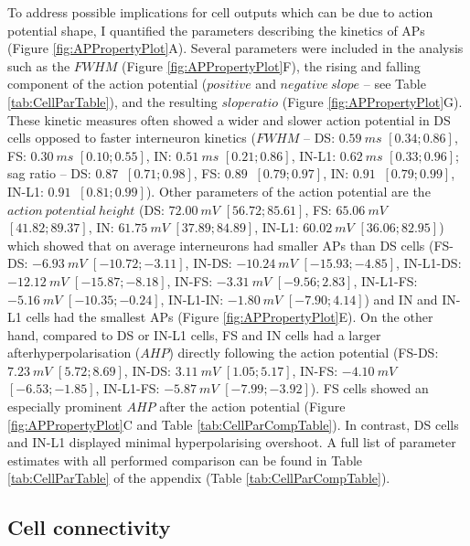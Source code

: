 \documentclass[
  12pt,
  a4paper,
  openany]{book}
\begin{document}
To address possible implications for cell outputs which can be due to action potential shape, I quantified the parameters describing the kinetics of APs (Figure \ref{fig:APPropertyPlot}A). Several parameters were included in the analysis such as the \(FWHM\) (Figure \ref{fig:APPropertyPlot}F), the rising and falling component of the action potential (\(positive\) and \(negative\ slope\) -- see Table \ref{tab:CellParTable}), and the resulting \(slope ratio\) (Figure \ref{fig:APPropertyPlot}G). These kinetic measures often showed a wider and slower action potential in DS cells opposed to faster interneuron kinetics (\(FWHM\) -- DS: \(0.59\ ms\) \([0.34; 0.86]\), FS: \(0.30\ ms\) \([0.10; 0.55]\), IN: \(0.51\ ms\) \([0.21; 0.86]\), IN-L1: \(0.62\ ms\) \([0.33; 0.96]\); sag ratio -- DS: \(0.87\ \) \([0.71; 0.98]\), FS: \(0.89\ \) \([0.79; 0.97]\), IN: \(0.91\ \) \([0.79; 0.99]\), IN-L1: \(0.91\ \) \([0.81; 0.99]\)). Other parameters of the action potential are the \(action\ potential\ height\) (DS: \(72.00\ mV\) \([56.72; 85.61]\), FS: \(65.06\ mV\) \([41.82; 89.37]\), IN: \(61.75\ mV\) \([37.89; 84.89]\), IN-L1: \(60.02\ mV\) \([36.06; 82.95]\)) which showed that on average interneurons had smaller APs than DS cells (FS-DS: \(-6.93\ mV\) \([-10.72; -3.11]\), IN-DS: \(-10.24\ mV\) \([-15.93; -4.85]\), IN-L1-DS: \(-12.12\ mV\) \([-15.87; -8.18]\), IN-FS: \(-3.31\ mV\) \([-9.56; 2.83]\), IN-L1-FS: \(-5.16\ mV\) \([-10.35; -0.24]\), IN-L1-IN: \(-1.80\ mV\) \([-7.90; 4.14]\)) and IN and IN-L1 cells had the smallest APs (Figure \ref{fig:APPropertyPlot}E). On the other hand, compared to DS or IN-L1 cells, FS and IN cells had a larger afterhyperpolarisation (\(AHP\)) directly following the action potential (FS-DS: \(7.23\ mV\) \([5.72; 8.69]\), IN-DS: \(3.11\ mV\) \([1.05; 5.17]\), IN-FS: \(-4.10\ mV\) \([-6.53; -1.85]\), IN-L1-FS: \(-5.87\ mV\) \([-7.99; -3.92]\)). FS cells showed an especially prominent \(AHP\) after the action potential (Figure \ref{fig:APPropertyPlot}C and Table \ref{tab:CellParCompTable}). In contrast, DS cells and IN-L1 displayed minimal hyperpolarising overshoot. A full list of parameter estimates with all performed comparison can be found in Table \ref{tab:CellParTable} of the appendix (Table \ref{tab:CellParCompTable}).

\FloatBarrier

\hypertarget{cell-connectivity-1}{%
\subsection{Cell connectivity}\label{cell-connectivity-1}}
\end{document}
